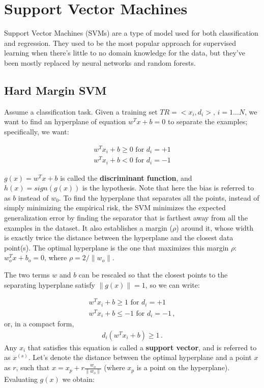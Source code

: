 \chapter{Support Vector Machines}

Support Vector Machines (SVMs) are a type of model used for both classification and regression. They used to be the most popular approach for supervised learning when there's little to no domain knowledge for the data, but they've been mostly replaced by neural networks and random forests.

\section{Hard Margin SVM}

Assume a classification task. Given a training set $TR = <x_i,d_i>, \, i=1 \dots N$, we want to find an hyperplane of equation $w^T x + b = 0$ to separate the examples; specifically, we want:

\begin{gather*}
    w^T x_i + b \geq 0 \text{ for } d_i = +1 \\
    w^T x_i + b < 0 \text{ for } d_i = -1
\end{gather*}

$g(x) = w^T x + b$ is called the \textbf{discriminant function}, and $h(x) = sign(g(x))$ is the hypothesis. Note that here the bias is referred to as $b$ instead of $w_0$. To find the hyperplane that separates all the points, instead of simply minimizing the empirical risk, the SVM minimizes the expected generalization error by finding the separator that is farthest away from all the examples in the dataset. It also establishes a margin ($\rho$) around it, whose width is exactly twice the distance between the hyperplane and the closest data point(s). The optimal hyperplane is the one that maximizes this margin $\rho$: $w_o^Tx + b_o = 0$, where $\rho = 2 / \|w_o\|$.

The two terms $w$ and $b$ can be rescaled so that the closest points to the separating hyperplane satisfy $\|g(x)\| = 1$, so we can write:

\begin{gather*}
    w^T x_i + b \geq 1 \text{ for } d_i = +1 \\
    w^T x_i + b \leq -1 \text{ for } d_i = -1 \, ,
\end{gather*}
or, in a compact form,
\begin{gather*}
    d_i(w^T x_i + b) \geq 1 \, .
\end{gather*}
Any $x_i$ that satisfies this equation is called a \textbf{support vector}, and is referred to as $x^{(s)}$. Let's denote the distance between the optimal hyperplane and a point $x$ as $r$, such that $x = x_p + r\frac{w_o}{\|w_o\|}$ (where $x_p$ is a point on the hyperplane). Evaluating $g(x)$ we obtain:

